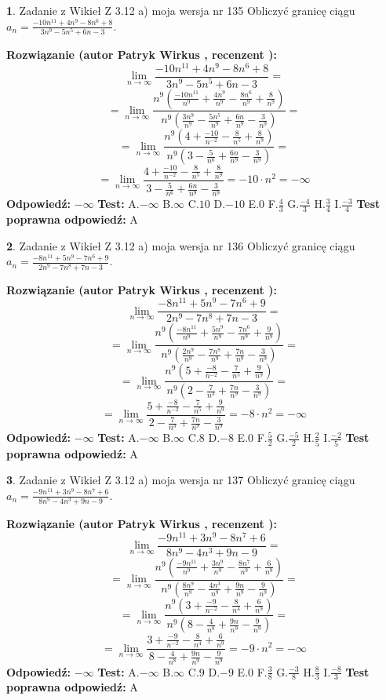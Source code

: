 \documentclass[12pt, a4paper]{article}
\theoremstyle{definition} %
\newtheorem{zad}{}
\newcommand{\zadStart}[1]{\begin{zad}#1\newline}
\newcommand{\zadStop}{\end{zad}}
\newcommand{\rozwStart}[2]{\noindent \textbf{Rozwiązanie (autor #1 , recenzent #2): }\newline}
\newcommand{\rozwStop}{\newline}
\newcommand{\odpStart}{\noindent \textbf{Odpowiedź:}\newline}
\newcommand{\odpStop}{\newline}
\newcommand{\testStart}{\noindent \textbf{Test:}\newline}
\newcommand{\testStop}{\newline}
\newcommand{\kluczStart}{\noindent \textbf{Test poprawna odpowiedź:}\newline}
\newcommand{\kluczStop}{\newline}
\begin{document}
\zadStart{Zadanie z Wikieł Z 3.12 a) moja wersja nr 135}
Obliczyć granicę ciągu $a_{n}=\frac{-10n^{11}+4n^{9}-8n^{6}+8}{3n^{9}-5n^{5}+6n-3}$.
\zadStop
\rozwStart{Patryk Wirkus}{}
$$\lim\limits_{n\to\infty}\frac{-10n^{11}+4n^{9}-8n^{6}+8}{3n^{9}-5n^{5}+6n-3}=$$
$$=\lim\limits_{n\to\infty}\frac{n^{9}\left(\frac{-10n^{11}}{n^{9}}+\frac{4n^{9}}{n^{9}}-\frac{8n^{6}}{n^{9}}+\frac{8}{n^{9}}\right)}{n^{9}\left(\frac{3n^{9}}{n^{9}}-\frac{5n^{5}}{n^{9}}+\frac{6n}{n^{9}}-\frac{3}{n^{9}}\right)}=$$
$$=\lim\limits_{n\to\infty}\frac{n^{9}\left(4+\frac{-10}{n^{-2}}-\frac{8}{n^{5}}+\frac{8}{n^{9}}\right)}
{n^{9}\left(3-\frac{5}{n^{6}}+\frac{6n}{n^{9}}-\frac{3}{n^{9}}\right)}=$$
$$=\lim\limits_{n\to\infty}\frac{4+\frac{-10}{n^{-2}}-\frac{8}{n^{5}}+\frac{8}{n^{9}}}{3-\frac{5}{n^{6}}+\frac{6n}{n^{9}}-\frac{3}{n^{9}}}=-10\cdot n^{2} = -\infty$$
\rozwStop
\odpStart
$-\infty$
\odpStop
\testStart
A.$-\infty$
B.$\infty$
C.$10$
D.$-10$
E.$0$
F.$\frac{4}{3}$
G.$\frac{-4}{3}$
H.$\frac{3}{4}$
I.$\frac{-3}{4}$
\testStop
\kluczStart
A
\kluczStop



\zadStart{Zadanie z Wikieł Z 3.12 a) moja wersja nr 136}
Obliczyć granicę ciągu $a_{n}=\frac{-8n^{11}+5n^{9}-7n^{6}+9}{2n^{9}-7n^{8}+7n-3}$.
\zadStop
\rozwStart{Patryk Wirkus}{}
$$\lim\limits_{n\to\infty}\frac{-8n^{11}+5n^{9}-7n^{6}+9}{2n^{9}-7n^{8}+7n-3}=$$
$$=\lim\limits_{n\to\infty}\frac{n^{9}\left(\frac{-8n^{11}}{n^{9}}+\frac{5n^{9}}{n^{9}}-\frac{7n^{6}}{n^{9}}+\frac{9}{n^{9}}\right)}{n^{9}\left(\frac{2n^{9}}{n^{9}}-\frac{7n^{8}}{n^{9}}+\frac{7n}{n^{9}}-\frac{3}{n^{9}}\right)}=$$
$$=\lim\limits_{n\to\infty}\frac{n^{9}\left(5+\frac{-8}{n^{-2}}-\frac{7}{n^{5}}+\frac{9}{n^{9}}\right)}
{n^{9}\left(2-\frac{7}{n^{3}}+\frac{7n}{n^{9}}-\frac{3}{n^{9}}\right)}=$$
$$=\lim\limits_{n\to\infty}\frac{5+\frac{-8}{n^{-2}}-\frac{7}{n^{5}}+\frac{9}{n^{9}}}{2-\frac{7}{n^{3}}+\frac{7n}{n^{9}}-\frac{3}{n^{9}}}=-8\cdot n^{2} = -\infty$$
\rozwStop
\odpStart
$-\infty$
\odpStop
\testStart
A.$-\infty$
B.$\infty$
C.$8$
D.$-8$
E.$0$
F.$\frac{5}{2}$
G.$\frac{-5}{2}$
H.$\frac{2}{5}$
I.$\frac{-2}{5}$
\testStop
\kluczStart
A
\kluczStop



\zadStart{Zadanie z Wikieł Z 3.12 a) moja wersja nr 137}
Obliczyć granicę ciągu $a_{n}=\frac{-9n^{11}+3n^{9}-8n^{7}+6}{8n^{9}-4n^{3}+9n-9}$.
\zadStop
\rozwStart{Patryk Wirkus}{}
$$\lim\limits_{n\to\infty}\frac{-9n^{11}+3n^{9}-8n^{7}+6}{8n^{9}-4n^{3}+9n-9}=$$
$$=\lim\limits_{n\to\infty}\frac{n^{9}\left(\frac{-9n^{11}}{n^{9}}+\frac{3n^{9}}{n^{9}}-\frac{8n^{7}}{n^{9}}+\frac{6}{n^{9}}\right)}{n^{9}\left(\frac{8n^{9}}{n^{9}}-\frac{4n^{3}}{n^{9}}+\frac{9n}{n^{9}}-\frac{9}{n^{9}}\right)}=$$
$$=\lim\limits_{n\to\infty}\frac{n^{9}\left(3+\frac{-9}{n^{-2}}-\frac{8}{n^{4}}+\frac{6}{n^{9}}\right)}
{n^{9}\left(8-\frac{4}{n^{8}}+\frac{9n}{n^{9}}-\frac{9}{n^{9}}\right)}=$$
$$=\lim\limits_{n\to\infty}\frac{3+\frac{-9}{n^{-2}}-\frac{8}{n^{4}}+\frac{6}{n^{9}}}{8-\frac{4}{n^{8}}+\frac{9n}{n^{9}}-\frac{9}{n^{9}}}=-9\cdot n^{2} = -\infty$$
\rozwStop
\odpStart
$-\infty$
\odpStop
\testStart
A.$-\infty$
B.$\infty$
C.$9$
D.$-9$
E.$0$
F.$\frac{3}{8}$
G.$\frac{-3}{8}$
H.$\frac{8}{3}$
I.$\frac{-8}{3}$
\testStop
\kluczStart
A
\kluczStop
\end{document}
